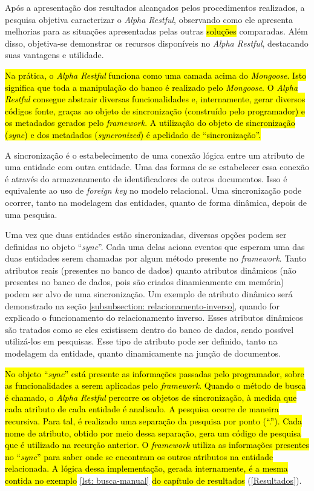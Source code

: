 Após a apresentação dos resultados alcançados pelos procedimentos realizados, a pesquisa objetiva caracterizar o \textit{Alpha Restful}, observando como ele apresenta melhorias para as situações apresentadas pelas outras \hl{soluções} comparadas. Além disso, objetiva-se demonstrar os recursos disponíveis no \textit{Alpha Restful}, destacando suas vantagens e utilidade.

\hl{Na prática, o \textit{Alpha Restful} funciona como uma camada acima do \textit{Mongoose}. Isto significa que toda a manipulação do banco é realizado pelo \textit{Mongoose}. O \textit{Alpha Restful} consegue abstrair diversas funcionalidades e, internamente, gerar diversos códigos fonte, graças ao objeto de sincronização (construído pelo programador) e os metadados gerados pelo \textit{framework}. A utilização do objeto de sincronização (\textit{sync}) e dos metadados (\textit{syncronized}) é apelidado de ``sincronização''.}

A sincronização é o estabelecimento de uma conexão lógica entre um atributo de uma entidade com outra entidade. Uma das formas de se estabelecer essa conexão é através do armazenamento de identificadores de outros documentos. Isso é equivalente ao uso de \textit{foreign key} no modelo relacional. Uma sincronização pode ocorrer, tanto na modelagem das entidades, quanto de forma dinâmica, depois de uma pesquisa.

Uma vez que duas entidades estão sincronizadas, diversas opções podem ser definidas no objeto ``\textit{sync}''. Cada uma delas aciona eventos que esperam uma das duas entidades serem chamadas por algum método presente no \textit{framework}. Tanto atributos reais (presentes no banco de dados) quanto atributos dinâmicos (não presentes no banco de dados, pois são criados dinamicamente em memória) podem ser alvo de uma sincronização. Um exemplo de atributo dinâmico será demonstrado na seção \ref{subsubsection: relacionamento-inverso}, quando for explicado o funcionamento do relacionamento inverso. Esses atributos dinâmicos são tratados como se eles existissem dentro do banco de dados, sendo possível utilizá-los em pesquisas. Esse tipo de atributo pode ser definido, tanto na modelagem da entidade, quanto dinamicamente na junção de documentos.

\hl{No objeto ``\textit{sync}'' está presente as informações passadas pelo programador, sobre as funcionalidades a serem aplicadas pelo \textit{framework}. Quando o método de busca é chamado, o \textit{Alpha Restful} percorre os objetos de sincronização, à medida que cada atributo de cada entidade é analisado. A pesquisa ocorre de maneira recursiva. Para tal, é realizado uma separação da pesquisa por ponto (``.''). Cada nome de atributo, obtido por meio dessa separação, gera um código de pesquisa que é utilizado na recurção anterior. O \textit{framework} utiliza as informações presentes no ``\textit{sync}'' para saber onde se encontram os outros atributos na entidade relacionada. A lógica dessa implementação, gerada internamente, é a mesma contida no exemplo} \ref{lst: busca-manual} \hl{do capítulo de resultados} (\ref{Resultados}).

